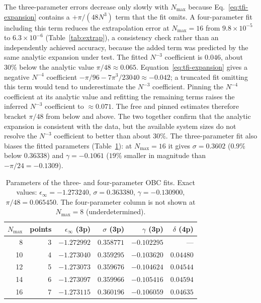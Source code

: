 \documentclass[pdflatex,sn-mathphys-num]{sn-jnl}
\begin{document}
The three-parameter errors decrease only slowly with $N_{\max}$
because Eq.~\eqref{eq:tfi-expansion} contains a $+\pi/(48N^3)$ term
that the fit omits. A four-parameter fit including this term reduces
the extrapolation error at $N_{\max} = 16$ from $9.8\times10^{-5}$ to
$6.3\times10^{-6}$ (Table~\ref{tab:extrap}), a consistency check
rather than an independently achieved accuracy, because the added
term was predicted by the same analytic expansion under test. The
fitted $N^{-3}$ coefficient is $0.046$, about $30\%$ below the
analytic value $\pi/48 \approx 0.065$. Equation~\eqref{eq:tfi-expansion}
gives a negative $N^{-4}$ coefficient
$-\pi/96 - 7\pi^3/23040 \approx -0.042$; a truncated fit omitting
this term would tend to underestimate the $N^{-3}$ coefficient.
Pinning the $N^{-4}$ coefficient at its analytic value and refitting
the remaining terms raises the inferred $N^{-3}$ coefficient to
$\approx 0.071$. The free and pinned estimates therefore bracket
$\pi/48$ from below and above. The two together confirm that the
analytic expansion is consistent with the data, but the available
system sizes do not resolve the $N^{-3}$ coefficient to better than
about $30\%$. The three-parameter fit also biases the fitted
parameters (Table~\ref{tab:fitparams}): at $N_{\max} = 16$ it gives
$\sigma = 0.3602$ ($0.9\%$ below $0.36338$) and $\gamma = -0.1061$
($19\%$ smaller in magnitude than $-\pi/24 = -0.1309$).

\begin{table}[t]
\centering
\small
\caption{Parameters of the three- and four-parameter OBC fits. Exact
values: $\epsilon_\infty = -1.273240$, $\sigma = 0.363380$,
$\gamma = -0.130900$, $\pi/48 = 0.065450$. The four-parameter column
is not shown at $N_{\max}=8$ (underdetermined).}
\label{tab:fitparams}
\begin{tabular}{rrrrrr}
\toprule
$N_{\max}$ & points & $\epsilon_\infty$ (3p) & $\sigma$ (3p) & $\gamma$ (3p) & $\delta$ (4p) \\
\midrule
8  & 3 & $-1.272992$ & $0.358771$ & $-0.102295$ & --- \\
10 & 4 & $-1.273040$ & $0.359295$ & $-0.103620$ & $0.04480$ \\
12 & 5 & $-1.273073$ & $0.359676$ & $-0.104624$ & $0.04544$ \\
14 & 6 & $-1.273097$ & $0.359966$ & $-0.105416$ & $0.04594$ \\
16 & 7 & $-1.273115$ & $0.360196$ & $-0.106059$ & $0.04635$ \\
\bottomrule
\end{tabular}
\end{table}
\end{document}

